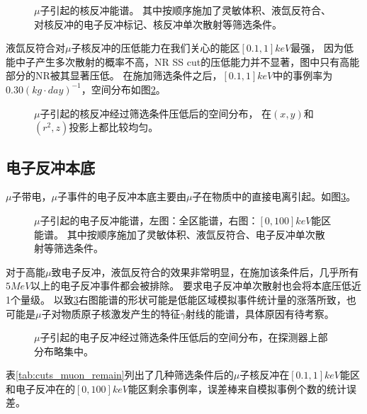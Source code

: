 \begin{figure}
  \centering
  
  \caption{\label{fig:muon_nr} $\mu$子引起的核反冲能谱。
  其中按顺序施加了灵敏体积、液氙反符合、对核反冲的电子反冲标记、核反冲单次散射等筛选条件。}
\end{figure}

液氙反符合对$\mu$子核反冲的压低能力在我们关心的能区$[0.1,1]\si{keV}$最强，
因为低能中子产生多次散射的概率不高，NR SS cut的压低能力并不显著，图中只有高能部分的NR被其显著压低。
在施加筛选条件之后，$[0.1,1]\si{keV}$中的事例率为$0.30\left(\si{kg}\cdot\si{day}\right)^{-1}$，空间分布如图\ref{fig:muon_nr_xyzr}。

\begin{figure}
  \centering
  
  \caption{\label{fig:muon_nr_xyzr} $\mu$子引起的核反冲经过筛选条件压低后的空间分布，
  在$(x,y)$和$(r^2,z)$投影上都比较均匀。}
\end{figure}

\subsection{电子反冲本底}

$\mu$子带电，$\mu$子事件的电子反冲本底主要由$\mu$子在物质中的直接电离引起。如图\ref{fig:muon_er}。

\begin{figure}
  \centering
  
  \caption{\label{fig:muon_er} $\mu$子引起的电子反冲能谱，左图：全区能谱，右图：$[0, 100]\si{keV}$能区能谱。
  其中按顺序施加了灵敏体积、液氙反符合、电子反冲单次散射等筛选条件。}
\end{figure}

对于高能$\mu$致电子反冲，液氙反符合的效果非常明显，在施加该条件后，几乎所有$5\si{MeV}$以上的电子反冲事件都会被排除。
要求电子反冲单次散射也会将本底压低近1个量级。
以致\ref{fig:muon_er}右图能谱的形状可能是低能区域模拟事件统计量的涨落所致，也可能是$\mu$子对物质原子核激发产生的特征$\gamma$射线的能谱，具体原因有待考察。

\begin{figure}
  \centering
  
  \caption{\label{fig:muon_er_xyzr} $\mu$子引起的电子反冲经过筛选条件压低后的空间分布，在探测器上部分布略集中。}
\end{figure}

表\ref{tab:cuts_muon_remain}列出了几种筛选条件后的$\mu$子核反冲在$[0.1,1]\si{keV}$能区和电子反冲在的$[0,100]\si{keV}$能区剩余事例率，误差棒来自模拟事例个数的统计误差。

